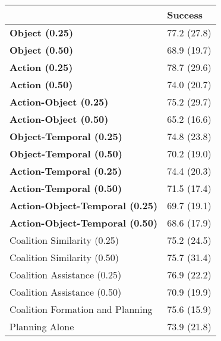 \begin{tabular}{ll}
\hline
                                        & Success     \\
\hline
 \textbf{Object (0.25)}                 & 77.2 (27.8) \\
 \textbf{Object (0.50)}                 & 68.9 (19.7) \\
 \textbf{Action (0.25)}                 & 78.7 (29.6) \\
 \textbf{Action (0.50)}                 & 74.0 (20.7) \\
 \textbf{Action-Object (0.25)}          & 75.2 (29.7) \\
 \textbf{Action-Object (0.50)}          & 65.2 (16.6) \\
 \textbf{Object-Temporal (0.25)}        & 74.8 (23.8) \\
 \textbf{Object-Temporal (0.50)}        & 70.2 (19.0) \\
 \textbf{Action-Temporal (0.25)}        & 74.4 (20.3) \\
 \textbf{Action-Temporal (0.50)}        & 71.5 (17.4) \\
 \textbf{Action-Object-Temporal (0.25)} & 69.7 (19.1) \\
 \textbf{Action-Object-Temporal (0.50)} & 68.6 (17.9) \\
 Coalition Similarity (0.25)            & 75.2 (24.5) \\
 Coalition Similarity (0.50)            & 75.7 (31.4) \\
 Coalition Assistance (0.25)            & 76.9 (22.2) \\
 Coalition Assistance (0.50)            & 70.9 (19.9) \\
 Coalition Formation and Planning       & 75.6 (15.9) \\
 Planning Alone                         & 73.9 (21.8) \\
\hline
\end{tabular}
